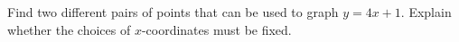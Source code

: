 Find two different pairs of points that can be used to graph $y=4x+1$. Explain whether the choices of $x$-coordinates must be fixed.
